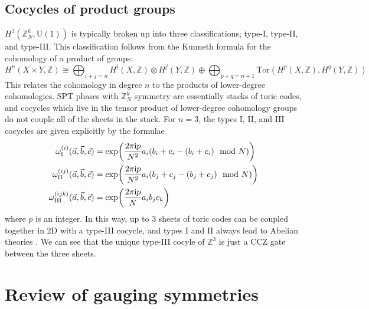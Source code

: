 \documentclass{article}
\theoremstyle{definition}
\theoremstyle{definition}
\newcommand{\Z}{\mathbb Z}
\newcommand{\Tor}{\text{Tor}}
\newcommand{\U}{\mathrm{U}}
\newcommand{\CCZ}{\mathrm{CCZ}}
\newcommand{\ii}{\mathrm{i}}
\begin{document}
\subsection{Cocycles of product groups}
$H^3(\Z_N^k, \U(1))$ is typically broken up into three classifications; type-I, type-II, and type-III. This classification follows from the Kunneth formula for the cohomology of a product of groups:
\begin{equation}
H^n(X \times Y, \Z) \cong \bigoplus_{i+j = n}H^i(X, \Z) \otimes H^j(Y, \Z) \oplus \bigoplus_{p+q=n+1}\Tor(H^p(X, \Z), H^q(Y, \Z))
\end{equation}
This relates the cohomology in degree $n$ to the products of lower-degree cohomologies. SPT phases with $\Z_N^k$ symmetry are essentially stacks of toric codes, and cocycles which live in the tensor product of lower-degree cohomology groups do not couple all of the sheets in the stack. For $n = 3$, the types I, II, and III cocycles are given explicitly by the formulae
\begin{align}
\omega^{(i)}_{\mathrm{I}}(\vec a, \vec b, \vec c) &= \exp(\frac{2\pi \ii p}{N^2}a_i\qty(b_i+c_i - (b_i + c_i) \mod N)) \\
\omega^{(ij)}_{\mathrm{II}}(\vec a, \vec b, \vec c) &= \exp(\frac{2\pi \ii p}{N^2}a_i\qty(b_j+c_j - (b_j + c_j) \mod N)) \\
\omega^{(ijk)}_{\mathrm{III}}(\vec a, \vec b, \vec c) &= \exp(\frac{2\pi \ii p}{N}a_ib_jc_k)
\end{align}
where $p$ is an integer.
In this way, up to 3 sheets of toric codes can be coupled together in 2D with a type-III cocycle, and types I and II always lead to Abelian theories \cite{propitius}. We can see that the unique type-III cocyle of $\Z^3$ is just a $\CCZ$ gate between the three sheets.

\section{Review of gauging symmetries}
\end{document}

